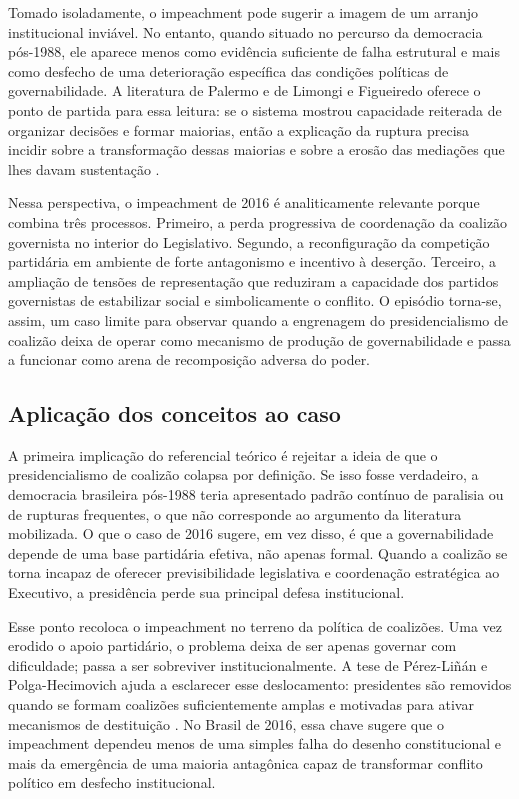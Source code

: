 \documentclass[12pt,a4paper]{article}
\begin{document}
Tomado isoladamente, o impeachment pode sugerir a imagem de um arranjo institucional inviável. No entanto, quando situado no percurso da democracia pós-1988, ele aparece menos como evidência suficiente de falha estrutural e mais como desfecho de uma deterioração específica das condições políticas de governabilidade. A literatura de Palermo e de Limongi e Figueiredo oferece o ponto de partida para essa leitura: se o sistema mostrou capacidade reiterada de organizar decisões e formar maiorias, então a explicação da ruptura precisa incidir sobre a transformação dessas maiorias e sobre a erosão das mediações que lhes davam sustentação \textcite{palermo2000_como_se} \textcite{limongi2017_a_crise}.

Nessa perspectiva, o impeachment de 2016 é analiticamente relevante porque combina três processos. Primeiro, a perda progressiva de coordenação da coalizão governista no interior do Legislativo. Segundo, a reconfiguração da competição partidária em ambiente de forte antagonismo e incentivo à deserção. Terceiro, a ampliação de tensões de representação que reduziram a capacidade dos partidos governistas de estabilizar social e simbolicamente o conflito. O episódio torna-se, assim, um caso limite para observar quando a engrenagem do presidencialismo de coalizão deixa de operar como mecanismo de produção de governabilidade e passa a funcionar como arena de recomposição adversa do poder.

\subsection{Aplicação dos conceitos ao caso}
\label{sec:orgeec92fc}
A primeira implicação do referencial teórico é rejeitar a ideia de que o presidencialismo de coalizão colapsa por definição. Se isso fosse verdadeiro, a democracia brasileira pós-1988 teria apresentado padrão contínuo de paralisia ou de rupturas frequentes, o que não corresponde ao argumento da literatura mobilizada. O que o caso de 2016 sugere, em vez disso, é que a governabilidade depende de uma base partidária efetiva, não apenas formal. Quando a coalizão se torna incapaz de oferecer previsibilidade legislativa e coordenação estratégica ao Executivo, a presidência perde sua principal defesa institucional.

Esse ponto recoloca o impeachment no terreno da política de coalizões. Uma vez erodido o apoio partidário, o problema deixa de ser apenas governar com dificuldade; passa a ser sobreviver institucionalmente. A tese de Pérez-Liñán e Polga-Hecimovich ajuda a esclarecer esse deslocamento: presidentes são removidos quando se formam coalizões suficientemente amplas e motivadas para ativar mecanismos de destituição \textcite{perez_lian2016_explaining_military}. No Brasil de 2016, essa chave sugere que o impeachment dependeu menos de uma simples falha do desenho constitucional e mais da emergência de uma maioria antagônica capaz de transformar conflito político em desfecho institucional.
\end{document}
